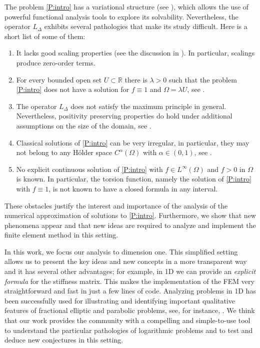 \documentclass[11 pt]{article}
\numberwithin{equation}{section}
\def\R{\mathbb{R}}
\begin{document}
The problem \eqref{P:intro} has a variational structure (see \cite{CW19}), which allows the use of powerful functional analysis tools to explore its solvability. Nevertheless, the operator $L_\Delta$ exhibits several pathologies that make its study difficult. Here is a short list of some of them:
\begin{enumerate}
    \item It lacks good scaling properties (see the discussion in \cite{CS22}).  In particular, scalings produce zero-order terms. 
    \item For every bounded open set $U\subset \R$ there is $\lambda>0$ such that the problem \eqref{P:intro} does not have a solution for $f\equiv 1$ and $\Omega=\lambda U$, see \cite[Remark 5.9]{CS22}.
    \item The operator $L_\Delta$ does not satisfy the maximum principle in general. Nevertheless, positivity preserving properties do hold under additional assumptions on the size of the domain, see \cite[Theorem 1.8 and Corollary 1.9]{CW19}.
    \item Classical solutions of \eqref{P:intro} can be very irregular, in particular, they may not belong to any Hölder space $C^\alpha(\Omega)$ with $\alpha\in(0,1)$, see \cite[Remark 5.6]{CS22}.
    \item No explicit continuous solution of \eqref{P:intro} with $f\in L^\infty(\Omega)$ and $f>0$ in $\Omega$ is known. In particular, the torsion function, namely the solution of \eqref{P:intro} with $f\equiv 1$, is not known to have a closed formula in any interval.
\end{enumerate}

 These obstacles justify the interest and importance of the analysis of the numerical approximation of solutions to \eqref{P:intro}.  Furthermore, we show that new phenomena appear and that new ideas are required to analyze and implement the finite element method in this setting.

In this work, we focus our analysis to dimension one. This simplified setting allows us to present the key ideas and new concepts in a more transparent way and it has several other advantages; for example, in 1D we can provide an \emph{explicit formula} for the stiffness matrix.  This makes the implementation of the FEM very straightforward and fast in just a few lines of code.  Analyzing problems in 1D has been successfully used for illustrating and identifying important qualitative features of fractional elliptic and parabolic problems, see, for instance, \cite{ABBM18,BdPM18,BHS19,CGH20}. We think that our work provides the community with a compelling and simple-to-use tool to understand the particular pathologies of logarithmic problems and to test and deduce new conjectures in this setting.
\end{document}
